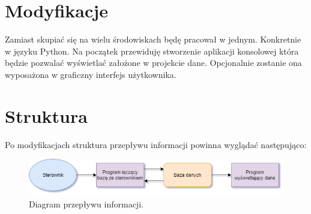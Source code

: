 \documentclass[10pt, a4paper]{article}
\begin{document}
\section{Modyfikacje}
Zamiast skupiać się na wielu środowiskach będę pracował w jednym. Konkretnie w języku Python. Na początek przewiduję stworzenie aplikacji konsolowej która będzie pozwalać wyświetlać założone w projekcie dane. Opcjonalnie zostanie ona wyposażona w graficzny interfejs użytkownika.

\section{Struktura}
Po modyfikacjach struktura przepływu informacji powinna wyglądać następująco:
	\begin{figure}[H]
		\centering
		\includegraphics[width=1\textwidth]{figures/diag.png}
		\caption{Diagram przepływu informacji.}
		\label{Measurements}
	\end{figure}
	
\end{document}
